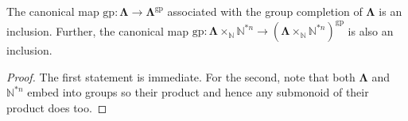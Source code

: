 \documentclass{amsbook} %
\newcommand{\ML}{\mathbf{\Lambda}}
\newcommand{\ELnn}{E\Lambda(\underline{2n})}
\numberwithin{section}{chapter}
\begin{document}
\begin{cor} \label{gpcompin} The canonical map $\mathrm{gp} : \ML \to \ML^{\mathrm{gp}}$ associated with the group completion of $\ML$ is an inclusion. Further, the canonical map $\mathrm{gp} : \ML\times_{\mathbb{N}} \mathbb{N}^{\ast n} \to (\ML\times_{\mathbb{N}} \mathbb{N}^{\ast n})^{\mathrm{gp}}$  is also an inclusion.
\end{cor}
\begin{proof}
The first statement is immediate. For the second, note that both $\ML$ and $\mathbb{N}^{\ast n}$ embed into groups so their product and hence any submonoid of their product does too.
\end{proof}


%
\end{document}

